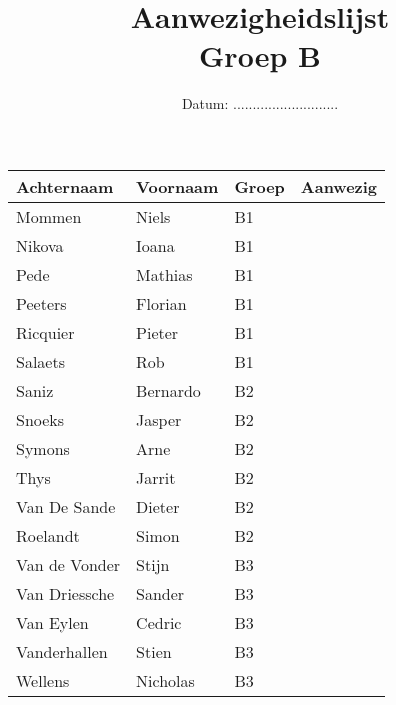 \documentclass[12pt,a4paper]{article}
\title{\textbf{Aanwezigheidslijst}\\Groep B}
\author{}
\date{Datum: ...........................}
\begin{document}
\maketitle

\begin{table}[!h]
\centering
\begin{tabular}{lllm{8cm}}
\toprule[1.5pt]
\textbf{Achternaam} & \textbf{Voornaam} & \textbf{Groep} & \textbf{Aanwezig} \\
\midrule[1.5pt]
Mommen & Niels & B1 & \\
\midrule
Nikova & Ioana & B1 & \\
\midrule
Pede & Mathias & B1 & \\
\midrule
Peeters & Florian & B1 & \\
\midrule
Ricquier & Pieter & B1 & \\
\midrule
Salaets & Rob & B1 & \\
\midrule[1.5pt]
Saniz & Bernardo & B2 & \\
\midrule
Snoeks & Jasper & B2 & \\
\midrule
Symons & Arne & B2 & \\
\midrule
Thys & Jarrit & B2 & \\
\midrule
Van De Sande & Dieter & B2 & \\
\midrule
Roelandt & Simon & B2 & \\
\midrule[1.5pt]
Van de Vonder & Stijn & B3 & \\
\midrule
Van Driessche & Sander & B3 & \\
\midrule
Van Eylen & Cedric & B3 & \\
\midrule
Vanderhallen & Stien & B3 & \\
\midrule
Wellens & Nicholas & B3 & \\
\bottomrule[1.5pt]
\end{tabular}
\end{table}
\end{document}
